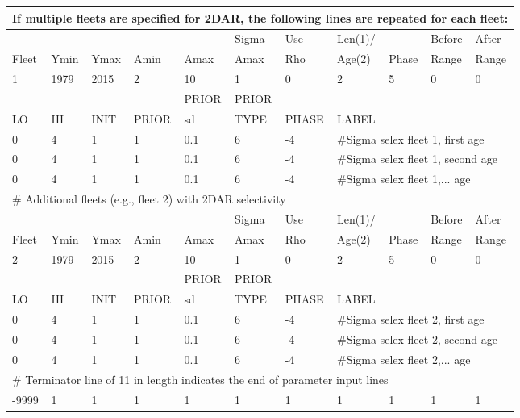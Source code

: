 \begin{longtable}{p{1cm} p{1cm} p{1cm} p{1.25cm} p{1.25cm} p{1.25cm} p{1.2cm} p{1.2cm} p{1cm} p{1cm} p{1cm}}
	\multicolumn{11}{l}{If multiple fleets are specified for 2DAR, the following lines are repeated for each fleet:} \\
	\hline
	\Tstrut &    &      &      &      & Sigma & Use & Len(1)/ &       & Before & After \\
	Fleet & Ymin & Ymax & Amin & Amax & Amax  & Rho & Age(2)  & Phase & Range  & Range \Bstrut\\
	\hline
	   1    & 1979 & 2015 &  2   &  10  & 1     & 0   & 2       & 5     & 0   & 0 \Tstrut\\
	\hline
	     &    &      &     & PRIOR    & PRIOR &       &     & & & \Tstrut\\
	LO & HI & INIT & PRIOR & \gls{sd} & TYPE  & PHASE & \multicolumn{4}{l}{LABEL} \Bstrut\\
	\hline
	 0 & 4 & 1 & 1 & 0.1 & 6 & -4 & \multicolumn{4}{l}{\#Sigma selex fleet 1, first age} \Tstrut\\
	 0 & 4 & 1 & 1 & 0.1 & 6 & -4 & \multicolumn{4}{l}{\#Sigma selex fleet 1, second age} \Tstrut\\
	 0 & 4 & 1 & 1 & 0.1 & 6 & -4 & \multicolumn{4}{l}{\#Sigma selex fleet 1,... age} \Tstrut\\
	\hline
	\multicolumn{11}{l}{\# Additional fleets (e.g., fleet 2) with 2DAR selectivity} \\
	\Tstrut &    &      &      &      & Sigma & Use & Len(1)/ &       & Before & After \\
	Fleet & Ymin & Ymax & Amin & Amax & Amax  & Rho & Age(2)  & Phase & Range  & Range \Bstrut\\
	\hline
	2    & 1979 & 2015 &  2   &  10  & 1     & 0   & 2       & 5     & 0   & 0 \Tstrut\\
	\hline
	   &    &      &       & PRIOR    & PRIOR &       &     & & & \Tstrut\\
	LO & HI & INIT & PRIOR & \gls{sd} & TYPE  & PHASE & \multicolumn{4}{l}{LABEL} \Bstrut\\
	\hline
	0 & 4 & 1 & 1 & 0.1 & 6 & -4 & \multicolumn{4}{l}{\#Sigma selex fleet 2, first age} \Tstrut\\
	0 & 4 & 1 & 1 & 0.1 & 6 & -4 & \multicolumn{4}{l}{\#Sigma selex fleet 2, second age} \Tstrut\\
	0 & 4 & 1 & 1 & 0.1 & 6 & -4 & \multicolumn{4}{l}{\#Sigma selex fleet 2,... age} \Tstrut\\
	\hline
	\multicolumn{11}{l}{\# Terminator line of 11 in length indicates the end of parameter input lines} \\
	-9999 & 1 & 1 & 1 & 1 & 1 & 1 & 1 & 1 & 1 & 1 \\
	\hline
\end{longtable}


